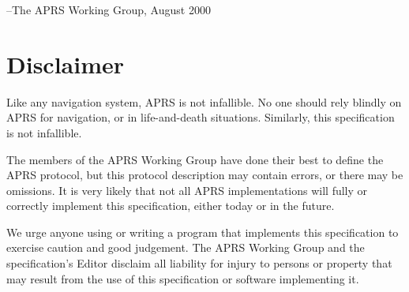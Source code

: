 --The APRS Working Group, August 2000


\section*{Disclaimer}

Like any navigation system, APRS is not infallible. No one should rely
blindly on APRS for navigation, or in life-and-death situations. Similarly,
this specification is not infallible.

The members of the APRS Working Group have done their best to define the
APRS protocol, but this protocol description may contain errors, or there
may be omissions. It is very likely that not all APRS implementations will
fully or correctly implement this specification, either today or in the future.


We urge anyone using or writing a program that implements this
specification to exercise caution and good judgement. The APRS Working
Group and the specification’s Editor disclaim all liability for injury to
persons or property that may result from the use of this specification or
software implementing it.

